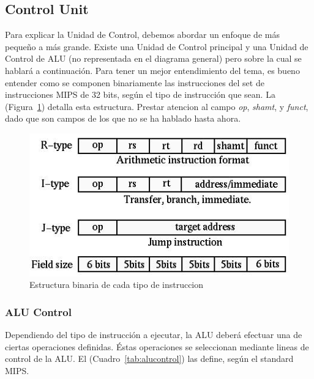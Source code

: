 \documentclass[12pt]{article}
\begin{document}
\subsection{Control Unit}

Para explicar la Unidad de Control, debemos abordar un enfoque de más pequeño a más grande. Existe una Unidad de Control principal y una Unidad de Control de ALU (no representada en el diagrama general) pero sobre la cual se hablará a continuación. Para tener un mejor entendimiento del tema, es bueno entender como se componen binariamente las instrucciones del set de instrucciones MIPS de 32 bits, según el tipo de instrucción que sean. La (Figura~\ref{fig:instrucciones}) detalla esta estructura. Prestar atencion al campo \textit{op}, \textit{shamt}, y \textit{funct}, dado que son campos de los que no se ha hablado hasta ahora.

\begin{figure}[ht]
\centering
\hspace*{-1cm}
\includegraphics[width=.5\textwidth]{imagenes/estructura_instrucciones.jpeg}
\caption{Estructura binaria de cada tipo de instruccion \cite{patterson}}
\label{fig:instrucciones}
\end{figure}

\subsubsection{ALU Control}

Dependiendo del tipo de instrucción a ejecutar, la ALU deberá efectuar una de ciertas operaciones definidas. Éstas operaciones se seleccionan mediante lineas de control de la ALU. El (Cuadro~\ref{tab:alucontrol}) las define, según el standard MIPS.
\end{document}
